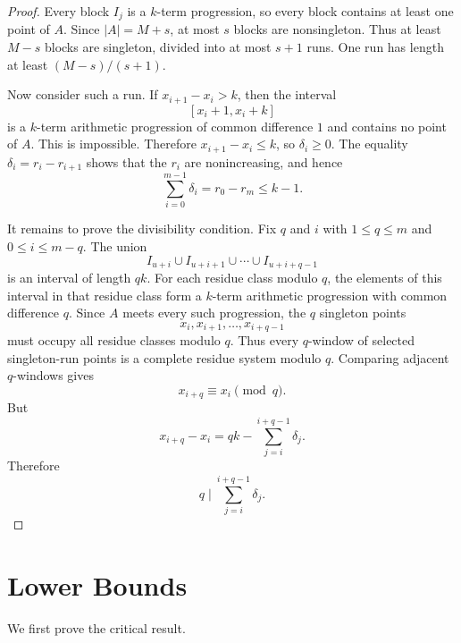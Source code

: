 \documentclass[11pt]{article}
\theoremstyle{remark}
\numberwithin{equation}{section}
\begin{document}
\begin{proof}
Every block $I_j$ is a $k$-term progression, so every block contains at least one point of $A$.
Since $|A|=M+s$, at most $s$ blocks are nonsingleton.
Thus at least $M-s$ blocks are singleton, divided into at most $s+1$ runs.
One run has length at least $(M-s)/(s+1)$.

Now consider such a run.
If $x_{i+1}-x_i>k$, then the interval
\[
        [x_i+1,x_i+k]
\]
is a $k$-term arithmetic progression of common difference $1$ and contains no point of $A$.
This is impossible.
Therefore $x_{i+1}-x_i\le k$, so $\delta_i\ge0$.
The equality $\delta_i=r_i-r_{i+1}$ shows that the $r_i$ are nonincreasing, and hence
\[
        \sum_{i=0}^{m-1}\delta_i=r_0-r_m\le k-1.
\]

It remains to prove the divisibility condition.
Fix $q$ and $i$ with $1\le q\le m$ and $0\le i\le m-q$.
The union
\[
        I_{u+i}\cup I_{u+i+1}\cup\cdots\cup I_{u+i+q-1}
\]
is an interval of length $qk$.
For each residue class modulo $q$, the elements of this interval in that residue class form a $k$-term arithmetic progression with common difference $q$.
Since $A$ meets every such progression, the $q$ singleton points
\[
        x_i,x_{i+1},\ldots,x_{i+q-1}
\]
must occupy all residue classes modulo $q$.
Thus every $q$-window of selected singleton-run points is a complete residue system modulo $q$.
Comparing adjacent $q$-windows gives
\[
        x_{i+q}\equiv x_i\pmod q.
\]
But
\[
        x_{i+q}-x_i
        =qk-
        \sum_{j=i}^{i+q-1}\delta_j.
\]
Therefore
\[
        q\mid \sum_{j=i}^{i+q-1}\delta_j.
\]
\end{proof}

\section{Lower Bounds}

We first prove the critical result.
\end{document}
